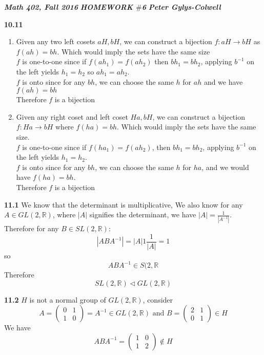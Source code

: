 \documentclass[12pt]{article}
\newenvironment{ques}{\vspace{2 ex}}{\vspace{2 ex}}
\theoremstyle{definition}
\begin{document}
\noindent \textit{\textbf{Math 402, Fall 2016}} \hspace{1.3cm}
\textit{\textbf{HOMEWORK $\#$6}} \hspace{1.3cm} \textit{\textbf{Peter
Gylys-Colwell}} 

\vspace{1cm}

\begin{ques}
	\textbf{10.11}
		\begin{enumerate}
			\item
				Given any two left cosets $aH, bH$, we can
				construct a bijection $f : aH \to bH$ as
				$f(ah) = bh$. Which would imply the sets have
				the same size \\
				$f$ is one-to-one since if $f(ah_1) = f(ah_2)$
				then $bh_1 = bh_2$, applying $b^{-1}$ on the
				left yields $h_1 = h_2$ so $ah_1 = ah_2$.\\
				$f$ is onto since for any $bh$, we can choose the
				same $h$ for $ah$ and we have $f(ah) = bh$\\
				Therefore $f$ is a bijection
			\item
				Given any right coset and left coset $Ha, bH$,
				we can construct a bijection $f : Ha \to bH$
				where $f(ha) = bh$. Which would imply the sets
				have the same size.\\
				$f$ is one-to-one since if $f(ha_1) = f(ah_2)$,
				then $bh_1 = bh_2$, applying $b^{-1}$ on the
				left yields $h_1 = h_2$.\\
				$f$ is onto since for any $bh$, we can choose
				the same $h$ for $ha$, and we would have $f(ha)
				= bh$.\\
				Therefore $f$ is a bijection
		\end{enumerate}

\end{ques}

\begin{ques}
	\textbf{11.1}
		We know that the determinant is multiplicative, We also know
		for any $A \in GL(2,\mathbb{R})$, where $|A|$ signifies the
		determinant, we have $|A| = \frac{1}{|A^{-1}|}$.\\
		Therefore for any $B \in SL(2, \mathbb{R})$:
		$$|ABA^{-1}| = |A|1\frac{1}{|A|} = 1$$
		so
		$$ABA^{-1} \in S(2,\mathbb{R}$$
		Therefore
		$$SL(2,\mathbb{R}) \triangleleft GL(2, \mathbb{R})$$
\end{ques}

\begin{ques}
	\textbf{11.2}
		$H$ is not a normal group of $GL(2,\mathbb{R})$, consider
		$$A =\left (\begin{array}{cc}
			0 & 1\\
			1 & 0
		\end{array}\right) = A^{-1} \in GL(2,\mathbb{R}) \text{ and } 
		B = \left (\begin{array}{cc}
			2 & 1\\
			0 & 1 
		\end{array}\right) \in H$$
		We have
		$$ABA^{-1} = \left(\begin{array}{cc}
			1 & 0\\
			1 & 2
		\end{array}\right) \notin H$$
\end{ques}
\end{document}
